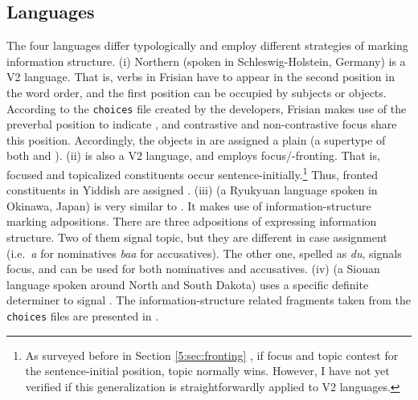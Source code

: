 \subsection{Languages}
\label{13:ssec:lc-lang}

The four languages differ typologically and employ different
strategies of marking information structure.  (i) Northern
 (spoken in Schleswig-Holstein, Germany) is a V2
language. That is, verbs in Frisian have to appear in the second
position in the word order, and the first position can be occupied by
subjects or objects. According to the \texttt{choices} file created by
the developers, Frisian makes use of the preverbal position to
indicate , and contrastive and non-contrastive focus share this
position. Accordingly,
the  objects in  are
assigned a plain  (a supertype of both 
and ).
(ii)  is also a V2 language,
and employs focus/-fronting. That is, focused and topicalized
constituents occur sentence-initially.\footnote{As surveyed before in
  Section \ref{5:sec:fronting} , if focus and topic
  contest for the sentence-initial position, topic normally wins.
  However, I have not yet verified if this generalization is
  straightforwardly applied to V2 languages.} Thus, fronted
constituents in Yiddish are assigned .  (iii)
 (a Ryukyuan language spoken in Okinawa, Japan) is very
similar to . It makes use of information-structure
marking adpositions. There are three adpositions of
expressing information structure. Two of them signal topic, but they
are different in case assignment (i.e.\ \textit{a} for nominatives \vs
\textit{baa} for accusatives). The other one, spelled as \textit{du},
signals focus, and can be used for both nominatives and accusatives.
(iv)  (a Siouan language spoken around North and South
Dakota) uses a specific definite determiner
\textit{} to signal . The
information-structure related fragments taken from the
\texttt{choices} files are presented in .

